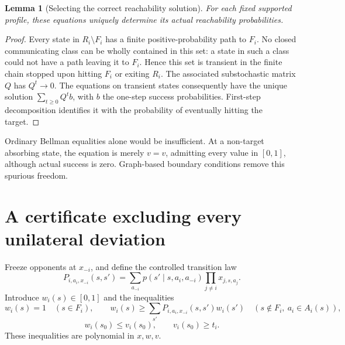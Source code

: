 \documentclass[11pt]{article}
\newtheorem{lemma}{Lemma}
\begin{document}
\begin{lemma}[Selecting the correct reachability solution]
For each fixed supported profile, these equations uniquely determine its actual reachability probabilities.
\end{lemma}
\begin{proof}
Every state in $R_i\setminus F_i$ has a finite positive-probability path to $F_i$. No closed communicating class can be wholly contained in this set: a state in such a class could not have a path leaving it to $F_i$. Hence this set is transient in the finite chain stopped upon hitting $F_i$ or exiting $R_i$. The associated substochastic matrix $Q$ has $Q^t\to0$. The equations on transient states consequently have the unique solution $\sum_{t\geq0}Q^tb$, with $b$ the one-step success probabilities. First-step decomposition identifies it with the probability of eventually hitting the target.
\end{proof}

Ordinary Bellman equalities alone would be insufficient. At a non-target absorbing state, the equation is merely $v=v$, admitting every value in $[0,1]$, although actual success is zero. Graph-based boundary conditions remove this spurious freedom.

\section*{A certificate excluding every unilateral deviation}
Freeze opponents at $x_{-i}$, and define the controlled transition law
\[
 P_{i,a_i,x_{-i}}(s,s')=
 \sum_{a_{-i}}p(s'\mid s,a_i,a_{-i})\prod_{j\ne i}x_{j,s,a_j}.
\]
Introduce $w_i(s)\in[0,1]$ and the inequalities
\[
 w_i(s)=1\quad(s\in F_i),\qquad
 w_i(s)\geq\sum_{s'}P_{i,a_i,x_{-i}}(s,s')w_i(s')
 \quad(s\notin F_i,\ a_i\in A_i(s)),
\]
\[
 w_i(s_0)\leq v_i(s_0),\qquad v_i(s_0)\geq t_i.
\]
These inequalities are polynomial in $x,w,v$.
\end{document}
